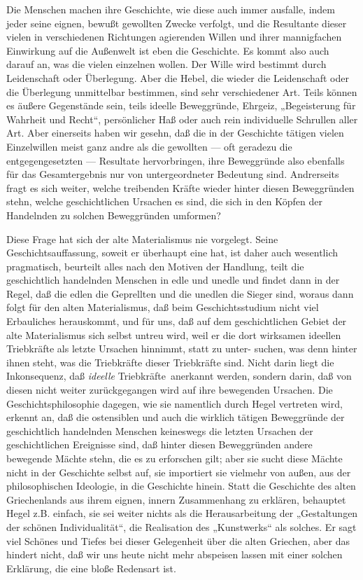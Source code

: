 Die Menschen machen ihre Geschichte, wie diese auch immer
ausfalle, indem jeder seine eignen, bewußt gewollten Zwecke verfolgt,
und die Resultante dieser vielen in verschiedenen Richtungen agierenden
Willen und ihrer mannigfachen Einwirkung auf die Außenwelt ist eben die
Geschichte. Es kommt also auch darauf an, was die vielen einzelnen
wollen. Der Wille wird bestimmt durch Leidenschaft oder Überlegung. Aber
die Hebel, die wieder die Leidenschaft oder die Überlegung unmittelbar
bestimmen, sind sehr verschiedener Art. Teils können es äußere
Gegenstände sein, teils ideelle Beweggründe, Ehrgeiz, „Begeisterung für
Wahrheit und Recht``, persönlicher Haß oder auch rein individuelle
Schrullen aller Art. Aber einerseits haben wir gesehn, daß die in der
Geschichte tätigen vielen Einzelwillen meist ganz andre als die
gewollten --- oft geradezu die entgegengesetzten --- Resultate
hervorbringen, ihre Beweggründe also ebenfalls für das Gesamtergebnis
nur von untergeordneter Bedeutung sind. Andrerseits fragt es sich
weiter, welche treibenden Kräfte wieder hinter diesen Beweggründen
stehn, welche geschichtlichen Ursachen es sind, die sich in den Köpfen
der Handelnden zu solchen Beweggründen umformen?

Diese Frage hat sich der alte Materialismus nie vorgelegt. Seine
Geschichtsauffassung, soweit er überhaupt eine hat, ist daher auch
wesentlich pragmatisch, beurteilt alles nach den Motiven der Handlung,
teilt die geschichtlich handelnden Menschen in edle und unedle und
findet dann in der Regel, daß die edlen die Geprellten und die unedlen
die Sieger sind, woraus dann folgt für den alten Materialismus, daß beim
Geschichtsstudium nicht viel Erbauliches herauskommt, und für uns, daß
auf dem geschichtlichen Gebiet der alte Materialismus sich selbst untreu
wird, weil er die dort wirksamen ideellen Triebkräfte als letzte
Ursachen hinnimmt, statt zu
unter- suchen, was denn hinter
ihnen steht, was die Triebkräfte dieser Triebkräfte sind. Nicht darin
liegt die Inkonsequenz, daß \emph{ideelle} Triebkräfte\est\ anerkannt werden,
sondern darin, daß von diesen nicht weiter zurückgegangen wird auf ihre
bewegenden Ursachen. Die Geschichtsphilosophie dagegen, wie sie
namentlich durch Hegel vertreten wird, erkennt an, daß die ostensiblen
und auch die wirklich tätigen Beweggründe der geschichtlich handelnden
Menschen keineswegs die letzten Ursachen der geschichtlichen Ereignisse
sind, daß hinter diesen Beweggründen andere bewegende Mächte stehn, die
es zu erforschen gilt; aber sie sucht diese Mächte nicht in der
Geschichte selbst auf, sie importiert sie vielmehr von außen, aus der
philosophischen Ideologie, in die Geschichte hinein. Statt die
Geschichte des alten Griechenlands aus ihrem eignen, innern Zusammenhang
zu erklären, behauptet Hegel z.B. einfach, sie sei weiter nichts als die
Herausarbeitung der „Gestaltungen der schönen Individualität``, die
Realisation des „Kunstwerks`` als solches. Er sagt viel Schönes und
Tiefes bei dieser Gelegenheit über die alten Griechen, aber das hindert
nicht, daß wir uns heute nicht mehr abspeisen lassen mit einer solchen
Erklärung, die eine bloße Redensart ist.

